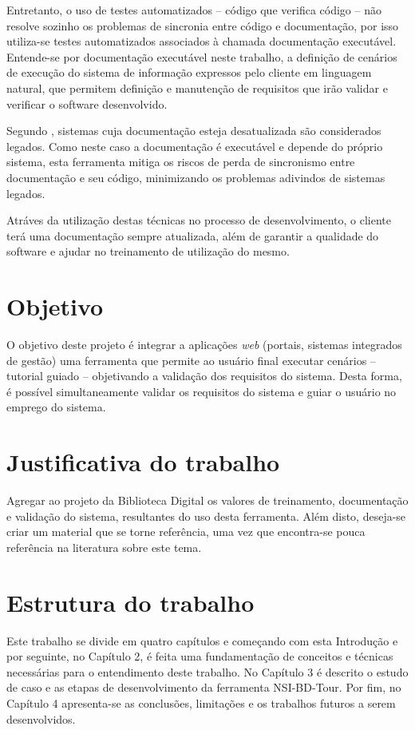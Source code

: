 Entretanto, o uso de testes automatizados – código que verifica código – não resolve sozinho os problemas de sincronia entre código e documentação, por isso utiliza-se testes automatizados associados à chamada documentação executável. Entende-se por documentação executável neste trabalho, a definição de cenários de execução do sistema de informação expressos pelo cliente em linguagem natural, que permitem definição e manutenção de requisitos que irão validar e verificar o software desenvolvido.

Segundo , sistemas cuja documentação esteja desatualizada são considerados legados. Como neste caso a documentação é executável e depende do próprio sistema, esta ferramenta mitiga os riscos de perda de sincronismo entre documentação e seu código, minimizando os problemas adivindos de sistemas legados.

Atráves da utilização destas técnicas no processo de desenvolvimento, o cliente terá uma documentação sempre atualizada, além de garantir a qualidade do software e ajudar no treinamento de utilização do mesmo.

\section{Objetivo}

O objetivo deste projeto é integrar a aplicações \textit{web} (portais, sistemas integrados de gestão) uma ferramenta que permite ao usuário final executar cenários – tutorial guiado – objetivando a validação dos requisitos do sistema. Desta forma, é possível simultaneamente validar os requisitos do sistema e guiar o usuário no emprego do sistema.

\section{Justificativa do trabalho}

Agregar ao projeto da Biblioteca Digital os valores de treinamento, documentação e validação do sistema, resultantes do uso desta ferramenta. Além disto, deseja-se criar um material que se torne referência, uma vez que encontra-se pouca referência na literatura sobre este tema.

\section{Estrutura do trabalho}

Este trabalho se divide em quatro capítulos e começando com esta Introdução e por seguinte, no Capítulo 2, é feita uma fundamentação de conceitos e técnicas necessárias para o entendimento deste trabalho. No Capítulo 3 é descrito o estudo de caso e as etapas de desenvolvimento da ferramenta NSI-BD-Tour. Por fim, no Capítulo 4 apresenta-se as conclusões, limitações e os trabalhos futuros a serem desenvolvidos.